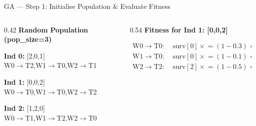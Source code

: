 \documentclass[aspectratio=169]{beamer}
\begin{document}
\begin{frame}{GA --- Step 1: Initialise Population \& Evaluate Fitness}
  \begin{columns}[T]
    \begin{column}{0.42\textwidth}
      \colorbox{navymid}{\color{teallt}\bfseries\small
        Random Population (pop\_size=3)}
      \vspace{3pt}

      \colorbox{offwhite}{\begin{minipage}{\linewidth}
        {\small\bfseries\color{navy} Ind 0:} {\small [2,0,1]}\\
        {\scriptsize\color{mygray} W0$\to$T2,\;W1$\to$T0,\;W2$\to$T1}
      \end{minipage}}
      \vspace{2pt}

      \colorbox{offwhite}{\begin{minipage}{\linewidth}
        {\small\bfseries\color{navy} Ind 1:} {\small [0,0,2]}\\
        {\scriptsize\color{mygray} W0$\to$T0,\;W1$\to$T0,\;W2$\to$T2}
      \end{minipage}}
      \vspace{2pt}

      \colorbox{offwhite}{\begin{minipage}{\linewidth}
        {\small\bfseries\color{navy} Ind 2:} {\small [1,2,0]}\\
        {\scriptsize\color{mygray} W0$\to$T1,\;W1$\to$T2,\;W2$\to$T0}
      \end{minipage}}
    \end{column}

    \begin{column}{0.54\textwidth}
      \colorbox{navymid}{\color{teallt}\bfseries\small
        Fitness for Ind 1: [0,0,2]}
      \vspace{4pt}

      {\small
      \begin{align*}
        \text{W0}\!\to\!\text{T0}:&\;
          \text{surv}[0] \mathrel{\times}= (1-0.3) = 0.7\\
        \text{W1}\!\to\!\text{T0}:&\;
          \text{surv}[0] \mathrel{\times}= (1-0.1) = 0.63\\
        \text{W2}\!\to\!\text{T2}:&\;
          \text{surv}[2] \mathrel{\times}= (1-0.5) = 0.5
      \end{align*}}


\end{column}
\end{columns}
\end{frame}
\end{document}
